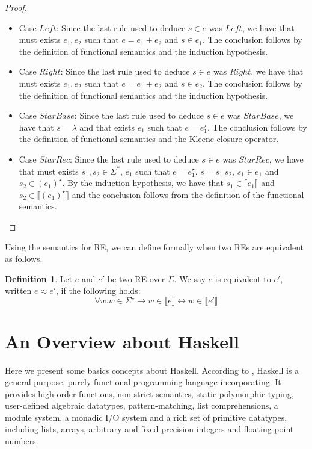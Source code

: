 \documentclass[oneside,12pt]{scrbook}
\theoremstyle{definition}
\newcommand{\sembrackets}[1]{\ensuremath{\llbracket #1 \rrbracket}}
\theoremstyle{plain}
\theoremstyle{definition}
\newtheorem{Definition}{Definition}
\begin{document}
\begin{proof}
\begin{itemize}
\begin{itemize}
      \item Case $Left$: Since the last rule used to deduce $s \in e$ was $Left$, we have that must exists $e_1, e_2$ such that $e = e_1 + e_2$ and
            $s \in e_1$. The conclusion follows by the definition of functional semantics and the induction hypothesis.
      \item Case $Right$: Since the last rule used to deduce $s \in e$ was $Right$, we have that must exists $e_1, e_2$ such that $e = e_1 + e_2$ and
            $s \in e_2$. The conclusion follows by the definition of functional semantics and the induction hypothesis.
      \item Case $StarBase$: Since the last rule used to deduce $s \in e$ was $StarBase$, we have that $s = \lambda$ and that exists $e_1$ such that
            $e = e_1^\star$. The conclusion follows by the definition of functional semantics and the Kleene closure operator.
      \item Case $StarRec$: Since the last rule used to deduce $s \in e$ was $StarRec$, we have that must exists $s_1,s_2 \in \Sigma^*$, $e_1$ such
            that $e = e_1^\star$, $s = s_1\:s_2$, $s_1 \in e_1$ and $s_2 \in (e_1)^\star$. By the induction hypothesis, we have that
            $s_1 \in\sembrackets{e_1}$ and $s_2\in\sembrackets{(e_1)^\star}$ and the conclusion follows from the definition of the functional semantics.
    \end{itemize}
  \end{itemize}
\end{proof}


Using the semantics for RE, we can define formally when two REs are equivalent as follows.

\begin{Definition}
   Let $e$ and $e'$ be two RE over $\Sigma$. We say $e$ is equivalent to $e'$, written $e \approx e'$, if the following holds:
   \[
       \forall w. w \in \Sigma^\star \to w \in \sembrackets{e} \leftrightarrow w \in \sembrackets{e'} 
   \]
\end{Definition}

\section{An Overview about Haskell}\label{section:haskell}

Here we present some basics concepts about Haskell. According to \cite{Haskell98}, Haskell is a general purpose, purely functional programming language incorporating. It provides high-order functions, non-strict semantics, static polymorphic typing, user-defined algebraic datatypes, pattern-matching, list comprehensions, a module system, a monadic I/O system and a rich set of primitive datatypes, including lists, arrays, arbitrary and fixed precision integers and floating-point numbers.
\end{document}

